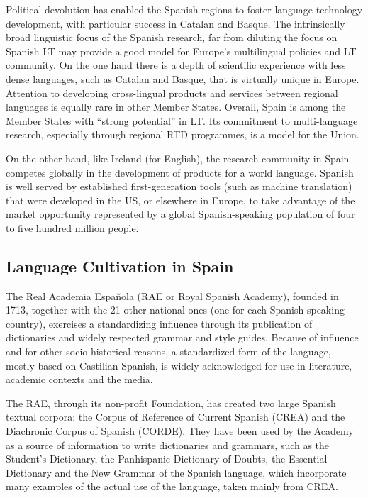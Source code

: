 \begin{multicols}{2}
Political devolution has enabled the Spanish regions to foster language technology development, with particular success in Catalan and Basque. The intrinsically broad linguistic focus of the Spanish research, far from diluting the focus on Spanish LT may provide a good model for Europe’s multilingual policies and LT community.
On the one hand there is a depth of scientific experience with less dense languages, such as Catalan and Basque, that is virtually unique in Europe. Attention to developing cross-lingual products and services between regional languages is equally rare in other Member States. Overall, Spain is among the Member States with “strong potential” in LT. Its commitment to multi-language research, especially through regional RTD programmes, is a model for the Union.

On the other hand, like Ireland (for English), the research community in Spain competes globally in the development of products for a world language. Spanish is well served by established first-generation tools (such as machine translation) that were developed in the US, or elsewhere in Europe, to take advantage of the market opportunity represented by a global Spanish-speaking population of four to five hundred million people.

\subsection{Language Cultivation in Spain}

The Real Academia Española (RAE or Royal Spanish Academy), founded in 1713, together with the 21 other national ones (one for each Spanish speaking country), exercises a standardizing influence through its publication of dictionaries and widely respected grammar and style guides. Because of influence and for other socio historical reasons, a standardized form of the language, mostly based on Castilian Spanish, is widely acknowledged for use in literature, academic contexts and the media. 

The RAE, through its non-profit Foundation, has created two large Spanish textual corpora: the  Corpus of Reference of Current Spanish (CREA) and the Diachronic Corpus of Spanish (CORDE). They have been used by the Academy as a source of  information to write dictionaries and grammars, such as the Student's Dictionary, the Panhispanic Dictionary of Doubts, the Essential Dictionary and the New Grammar of the Spanish language, which incorporate many examples of the actual use of the  language, taken mainly from CREA. 


\end{multicols}
